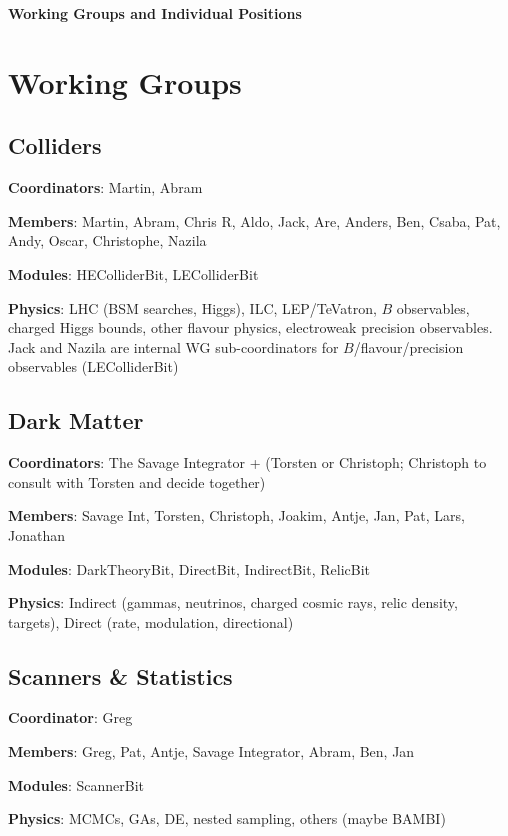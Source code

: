 

\centerline{\textbf{Working Groups and Individual Positions}}\bigskip 


\section{Working Groups}

\subsection{Colliders}

\textbf{Coordinators}: Martin, Abram

\textbf{Members}: Martin, Abram, Chris R, Aldo, Jack, Are, Anders, Ben, Csaba, Pat, Andy, Oscar, Christophe, Nazila

\textbf{Modules}: HEColliderBit, LEColliderBit

\textbf{Physics}: LHC (BSM searches, Higgs), ILC, LEP/TeVatron, $B$ observables, charged Higgs bounds, other flavour physics, electroweak precision observables.  Jack and Nazila are internal WG sub-coordinators for $B$/flavour/precision observables (LEColliderBit)


\subsection{Dark Matter}

\textbf{Coordinators}: The Savage Integrator + (Torsten or Christoph; Christoph to consult with Torsten and decide together)

\textbf{Members}: Savage Int, Torsten, Christoph, Joakim, Antje, Jan, Pat, Lars, Jonathan

\textbf{Modules}: DarkTheoryBit, DirectBit, IndirectBit, RelicBit

\textbf{Physics}: Indirect (gammas, neutrinos, charged cosmic rays, relic density, targets), Direct (rate, modulation, directional)


\subsection{Scanners \& Statistics}

\textbf{Coordinator}: Greg

\textbf{Members}: Greg, Pat, Antje, Savage Integrator, Abram, Ben, Jan

\textbf{Modules}: ScannerBit

\textbf{Physics}: MCMCs, GAs, DE, nested sampling, others (maybe BAMBI)


